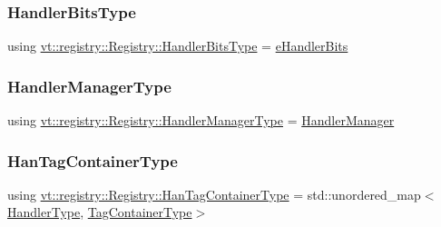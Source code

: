 \mbox{\label{structvt_1_1registry_1_1_registry_acf13f3553c4f5c82dd9bd1cb716d435f}} 
\subsubsection{\texorpdfstring{Handler\+Bits\+Type}{HandlerBitsType}}
{\footnotesize\ttfamily using \hyperlink{namespacevt_af182285b57b225b163d5d8aff03cb8c2}{vt\+::registry\+::\+Registry\+::\+Handler\+Bits\+Type} =  \hyperlink{namespacevt_af182285b57b225b163d5d8aff03cb8c2}{e\+Handler\+Bits}}

\mbox{\label{structvt_1_1registry_1_1_registry_a0717ad6519a3d2c6f3e1848182db4bfa}} 
\subsubsection{\texorpdfstring{Handler\+Manager\+Type}{HandlerManagerType}}
{\footnotesize\ttfamily using \hyperlink{structvt_1_1registry_1_1_registry_a0717ad6519a3d2c6f3e1848182db4bfa}{vt\+::registry\+::\+Registry\+::\+Handler\+Manager\+Type} =  \hyperlink{structvt_1_1_handler_manager}{Handler\+Manager}}

\mbox{\label{structvt_1_1registry_1_1_registry_ab5d336044aee749d39c8feabe4fa6983}} 
\subsubsection{\texorpdfstring{Han\+Tag\+Container\+Type}{HanTagContainerType}}
{\footnotesize\ttfamily using \hyperlink{structvt_1_1registry_1_1_registry_ab5d336044aee749d39c8feabe4fa6983}{vt\+::registry\+::\+Registry\+::\+Han\+Tag\+Container\+Type} =  std\+::unordered\+\_\+map$<$\hyperlink{namespacevt_af64846b57dfcaf104da3ef6967917573}{Handler\+Type}, \hyperlink{structvt_1_1registry_1_1_registry_abefc9cdcc8557c5d547dd3ae44ae0996}{Tag\+Container\+Type}$>$}

